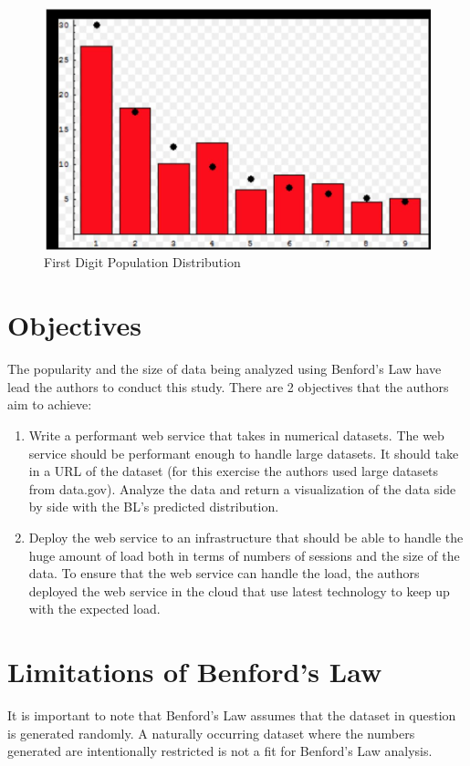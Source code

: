 \begin{figure}[!ht]
\centering\includegraphics[width=\columnwidth]{images/benford_country.JPG}
  \caption{First Digit Population Distribution}\label{f:pop-dist-countries}
\end{figure}

\section{Objectives}
The popularity and the size of data being 
analyzed using Benford’s Law have lead the authors 
to conduct this study. 
There are 2 objectives that the authors aim to achieve:

\begin{enumerate}
\item
Write a performant web service that takes in numerical datasets. 
The web service should be performant enough to handle large datasets. 
It should take in a URL of the dataset (for this exercise the authors used
large datasets from data.gov). Analyze the data and return a visualization 
of the data side by side with the BL’s predicted distribution.
\item
Deploy the web service to an infrastructure that should be able to handle 
the huge amount of load both in terms of numbers of sessions and the size 
of the data. To ensure that the web service can handle the load, 
the authors deployed the web service in the cloud that use latest 
technology to keep up with the expected load.
\end{enumerate}

\section{Limitations of Benford’s Law}
It is important to note that Benford’s Law assumes that the 
dataset in question is generated randomly. A naturally occurring 
dataset where the numbers generated are intentionally restricted 
is not a fit for Benford’s Law analysis. 

